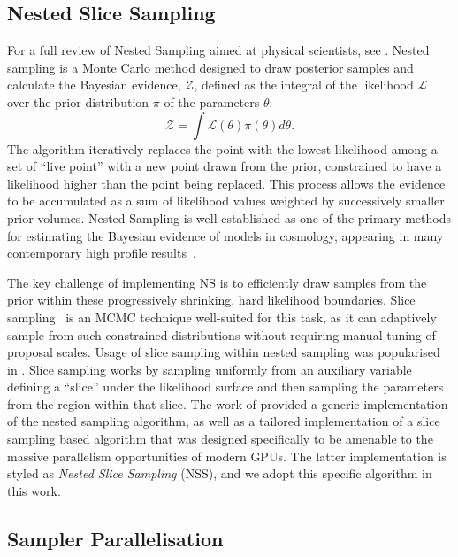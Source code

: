\documentclass[twocolumn]{openjournal}
\begin{document}
\subsection{Nested Slice Sampling}
For a full review of Nested Sampling aimed at physical scientists, see \citep{Ashton_2022}. Nested sampling is a Monte Carlo method designed to draw posterior samples and calculate the Bayesian evidence, $\mathcal{Z}$, defined as the integral of the likelihood $\mathcal{L}$ over the prior distribution $\pi$ of the parameters $\theta$:
\begin{equation}
    \mathcal{Z}=\int \mathcal{L}(\theta) \pi(\theta) d\theta. \label{eq:evidence}
\end{equation}
The algorithm iteratively replaces the point with the lowest likelihood among a set of ``live point'' with a new point drawn from the prior, constrained to have a likelihood higher than the point being replaced. This process allows the evidence to be accumulated as a sum of likelihood values weighted by successively smaller prior volumes. Nested Sampling is well established as one of the primary methods for estimating the Bayesian evidence of models in cosmology, appearing in many contemporary high profile results~\citep{planck,DES:2021wwk}.

The key challenge of implementing NS is to efficiently draw samples from the prior within these progressively shrinking, hard likelihood boundaries. Slice sampling~\citep{neal_slice_2003} is an MCMC technique well-suited for this task, as it can adaptively sample from such constrained distributions without requiring manual tuning of proposal scales. Usage of slice sampling within nested sampling was popularised in \cite{polychord}. Slice sampling works by sampling uniformly from an auxiliary variable defining a ``slice'' under the likelihood surface and then sampling the parameters from the region within that slice. The work of \cite{NSSyallup} provided a generic implementation of the nested sampling algorithm, as well as a tailored implementation of a slice sampling based algorithm that was designed specifically to be amenable to the massive parallelism opportunities of modern GPUs. The latter implementation is styled as \emph{Nested Slice Sampling} (NSS), and we adopt this specific algorithm in this work.

\subsection{Sampler Parallelisation}\label{samplerparall}
\end{document}
